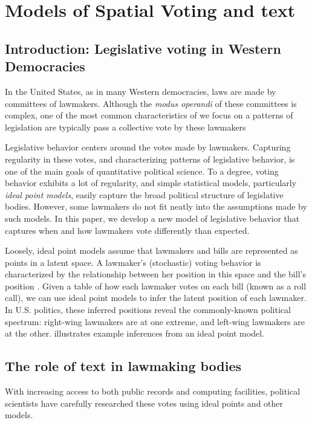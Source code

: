 \chapter{Models of Spatial Voting and text}

\section*{Introduction: Legislative voting in Western Democracies}

In the United States, as in many Western democracies, laws are made by
committees of lawmakers.  Although the \emph{modus operandi} of these
committees is complex, one of the most common characteristics of we
focus on a patterns of legislation are typically pass a collective
vote by these lawmakers

Legislative behavior centers around the votes made by lawmakers.
Capturing regularity in these votes, and characterizing patterns of
legislative behavior, is one of the main goals of quantitative
political science.  To a degree, voting behavior exhibits a lot of
regularity, and simple statistical models, particularly \textit{ideal
  point models}, easily capture the broad political structure of
legislative bodies.  However, some lawmakers do not fit neatly into
the assumptions made by such models.  In this paper, we develop a new
model of legislative behavior that captures when and how lawmakers
vote differently than expected.

Loosely, ideal point models assume that lawmakers and bills are
represented as points in a latent space.  A lawmaker's (stochastic)
voting behavior is characterized by the relationship between her
position in this space and the bill's position
\cite{poole:1991,jackman:2001,clinton:2004}.  Given a table of how
each lawmaker votes on each bill (known as a roll call), we can use
ideal point models to infer the latent position of each lawmaker.  In
U.S. politics, these inferred positions reveal the commonly-known
political spectrum: right-wing lawmakers are at one extreme, and
left-wing lawmakers are at the other.  
illustrates example inferences from an ideal point model.

\section{The role of text in lawmaking bodies}
With increasing access to both public records and computing
facilities, political scientists have carefully researched these votes
using ideal points and other models.

